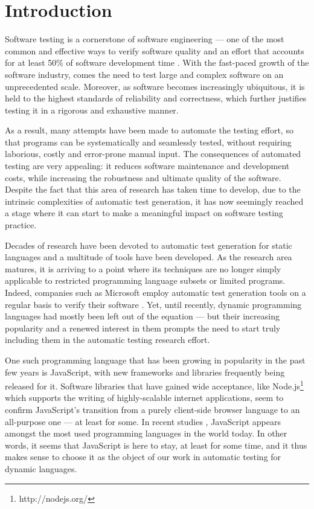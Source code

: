\chapter{Introduction}
\renewcommand{\arraystretch}{1.2}
\pagestyle{plain}
\setcounter{page}{1}
Software testing is a cornerstone of software engineering --- one of the most common and effective ways to verify software quality and an effort that accounts for at least 50\% of software development time \cite{tahbildar2automated}. With the fast-paced growth of the software industry, comes the need to test large and complex software on an unprecedented scale. Moreover, as software becomes increasingly ubiquitous, it is held to the highest standards of reliability and correctness, which further justifies testing it in a rigorous and exhaustive manner.

As a result, many attempts have been made to automate the testing effort, so that programs can be systematically and seamlessly tested, without requiring laborious, costly and error-prone manual input. The consequences of automated testing are very appealing: it reduces software maintenance and development costs, while increasing the robustness and ultimate quality of the software. Despite the fact that this area of research has taken time to develop, due to the intrinsic complexities of automatic test generation, it has now seemingly reached a stage where it can start to make a meaningful impact on software testing practice.

Decades of research have been devoted to automatic test generation for static languages and a multitude of tools have been developed. As the research area matures, it is arriving to a point where its techniques are no longer simply applicable to restricted programming language subsets or limited programs. Indeed, companies such as Microsoft employ automatic test generation tools on a regular basis to verify their software \cite{păsăreanu2009survey}. Yet, until recently, dynamic programming languages had mostly been left out of the equation --- but their increasing popularity and a renewed interest in them prompts the need to start truly including them in the automatic testing research effort.

One such programming language that has been growing in popularity in the past few years is JavaScript, with new frameworks and libraries frequently being released for it. Software libraries that have gained wide acceptance, like \textsf{Node.js}\footnote{http://nodejs.org/} which supports the writing of highly-scalable internet applications, seem to confirm JavaScript's transition from a purely client-side browser language to an all-purpose one --- at least for some. In recent studies \cite{website:langpop}, JavaScript appears amongst the most used programming languages in the world today. In other words, it seems that JavaScript is here to stay, at least for some time, and it thus makes sense to choose it as the object of our work in automatic testing for dynamic languages.

